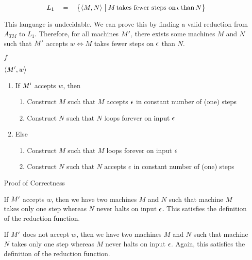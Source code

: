 \documentclass{article}
\begin{document}
\makeheader%

\begin{question}

	\begin{qpart}{1}

		\begin{align*}
			L_1	\quad = \quad	\left\{ \left\langle M, N \right\rangle \,\big|\, M \,\text{takes fewer steps on}\, \epsilon \,\text{than}\, N \right\}
		\end{align*}

		This language is undecidable. We can prove this by finding a valid reduction from $A_{TM}$ to $L_1$. Therefore, for all machines $M^{\prime}$, there exists some machines $M$ and $N$ such that $M^{\prime}$ accepts $w \iff M$ takes fewer steps on $\epsilon$ than $N$. \br%

		 $f$ \br%

		 $\left\langle M^{\prime}, w \right\rangle$
		\begin{enumerate}[label = (\alph*) ]
			\item If $M^{\prime}$ accepts $w$, then
				\begin{enumerate}[label = (\roman*) ]
					\item Construct $M$ such that $M$ accepts $\epsilon$ in constant number of (one) steps
					\item Construct $N$ such that $N$ loops forever on input $\epsilon$
				\end{enumerate}
			\item Else
				\begin{enumerate}[label = (\roman*) ]
					\item Construct $M$ such that $M$ loops forever on input $\epsilon$
					\item Construct $N$ such that $N$ accepts $\epsilon$ in constant number of (one) steps
				\end{enumerate}
		\end{enumerate}

		\begin{qsubsection}{Proof of Correctness}

			If $M^{\prime}$ accepts $w$, then we have two machines $M$ and $N$ such that machine $M$ takes only one step whereas $N$ never halts on input $\epsilon$. This satisfies the definition of the reduction function. \br%

			If $M^{\prime}$ does not accept $w$, then we have two machines $M$ and $N$ such that machine $N$ takes only one step whereas $M$ never halts on input $\epsilon$. Again, this satisfies the definition of the reduction function.


\end{qsubsection}
\end{qpart}
\end{question}
\end{document}
